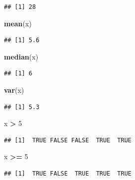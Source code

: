 \documentclass[
]{article}
\newenvironment{Shaded}{\begin{snugshade}}{\end{snugshade}}
\newcommand{\DecValTok}[1]{\textcolor[rgb]{0.00,0.00,0.81}{#1}}
\newcommand{\KeywordTok}[1]{\textcolor[rgb]{0.13,0.29,0.53}{\textbf{#1}}}
\newcommand{\NormalTok}[1]{#1}
\newcommand{\OperatorTok}[1]{\textcolor[rgb]{0.81,0.36,0.00}{\textbf{#1}}}
\newcommand{\StringTok}[1]{\textcolor[rgb]{0.31,0.60,0.02}{#1}}
\begin{document}
\begin{verbatim}
## [1] 28
\end{verbatim}

\begin{Shaded}
\begin{Highlighting}[]
\KeywordTok{mean}\NormalTok{(x)}
\end{Highlighting}
\end{Shaded}

\begin{verbatim}
## [1] 5.6
\end{verbatim}

\begin{Shaded}
\begin{Highlighting}[]
\KeywordTok{median}\NormalTok{(x)}
\end{Highlighting}
\end{Shaded}

\begin{verbatim}
## [1] 6
\end{verbatim}

\begin{Shaded}
\begin{Highlighting}[]
\KeywordTok{var}\NormalTok{(x)}
\end{Highlighting}
\end{Shaded}

\begin{verbatim}
## [1] 5.3
\end{verbatim}

\begin{Shaded}
\begin{Highlighting}[]
\NormalTok{x }\OperatorTok{>}\StringTok{ }\DecValTok{5}
\end{Highlighting}
\end{Shaded}

\begin{verbatim}
## [1]  TRUE FALSE FALSE  TRUE  TRUE
\end{verbatim}

\begin{Shaded}
\begin{Highlighting}[]
\NormalTok{x }\OperatorTok{>=}\StringTok{ }\DecValTok{5}
\end{Highlighting}
\end{Shaded}

\begin{verbatim}
## [1]  TRUE FALSE  TRUE  TRUE  TRUE
\end{verbatim}
\end{document}
